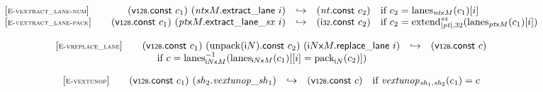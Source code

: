 \vspace{1ex}

$$
\begin{array}[t]{@{}lrcl@{}l@{}}
{[\textsc{\scriptsize E{-}vextract\_lane{-}num}]} \quad & (\mathsf{v{\scriptstyle 128}}{.}\mathsf{const}~c_1)~({{\mathit{nt}}}{\mathsf{x}}{M}{.}\mathsf{extract\_lane}~i) & \hookrightarrow & ({\mathit{nt}}{.}\mathsf{const}~c_2) & \quad \mbox{if}~ c_2 = {{\mathrm{lanes}}}_{{{\mathit{nt}}}{\mathsf{x}}{M}}(c_1){}[i] \\
{[\textsc{\scriptsize E{-}vextract\_lane{-}pack}]} \quad & (\mathsf{v{\scriptstyle 128}}{.}\mathsf{const}~c_1)~({{{\mathit{pt}}}{\mathsf{x}}{M}{.}\mathsf{extract\_lane}}{\mathsf{\_}}{{\mathit{sx}}}~i) & \hookrightarrow & (\mathsf{i{\scriptstyle 32}}{.}\mathsf{const}~c_2) & \quad \mbox{if}~ c_2 = {{{{\mathrm{extend}}}_{{|{\mathit{pt}}|}, 32}^{{\mathit{sx}}}}}{({{\mathrm{lanes}}}_{{{\mathit{pt}}}{\mathsf{x}}{M}}(c_1){}[i])} \\
\end{array}
$$

\vspace{1ex}

$$
\begin{array}[t]{@{}lrcl@{}l@{}}
{[\textsc{\scriptsize E{-}vreplace\_lane}]} \quad & (\mathsf{v{\scriptstyle 128}}{.}\mathsf{const}~c_1)~({\mathrm{unpack}}({\mathsf{i}}{N}){.}\mathsf{const}~c_2)~({{\mathsf{i}}{N}}{\mathsf{x}}{M}{.}\mathsf{replace\_lane}~i) & \hookrightarrow & (\mathsf{v{\scriptstyle 128}}{.}\mathsf{const}~c) &  \\
& \multicolumn{4}{@{}l@{}}{\quad
\quad \mbox{if}~ c = {{{{\mathrm{lanes}}}_{{{\mathsf{i}}{N}}{\mathsf{x}}{M}}^{{-1}}}}{({{\mathrm{lanes}}}_{{{\mathsf{i}}{N}}{\mathsf{x}}{M}}(c_1){}[{}[i] = {{\mathrm{pack}}}_{{\mathsf{i}}{N}}(c_2)])}
} \\
\end{array}
$$

\vspace{1ex}

$$
\begin{array}[t]{@{}lrcl@{}l@{}}
{[\textsc{\scriptsize E{-}vextunop}]} \quad & (\mathsf{v{\scriptstyle 128}}{.}\mathsf{const}~c_1)~({\mathit{sh}}_2 {.} {{\mathit{vextunop}}}{\mathsf{\_}}{{\mathit{sh}}_1}) & \hookrightarrow & (\mathsf{v{\scriptstyle 128}}{.}\mathsf{const}~c) & \quad \mbox{if}~ {{\mathit{vextunop}}}{{}_{{\mathit{sh}}_1, {\mathit{sh}}_2}(c_1)} = c \\
\end{array}
$$

